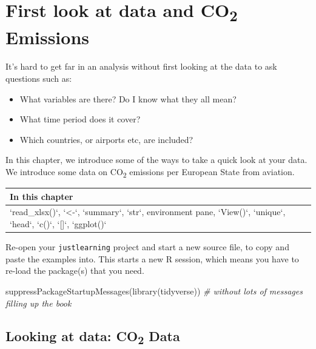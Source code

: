 \documentclass[
]{book}
\newenvironment{Shaded}{\begin{snugshade}}{\end{snugshade}}
\newcommand{\CommentTok}[1]{\textcolor[rgb]{0.56,0.35,0.01}{\textit{#1}}}
\newcommand{\FunctionTok}[1]{\textcolor[rgb]{0.00,0.00,0.00}{#1}}
\newcommand{\NormalTok}[1]{#1}
\providecommand{\tightlist}{%
  \setlength{\itemsep}{0pt}\setlength{\parskip}{0pt}}
\begin{document}
\hypertarget{first-look-at-data-and-co2-emissions}{%
\chapter{\texorpdfstring{First look at data and CO\textsubscript{2} Emissions}{First look at data and CO2 Emissions}}\label{first-look-at-data-and-co2-emissions}}

It's hard to get far in an analysis without first looking at the data to ask questions such as:

\begin{itemize}
\tightlist
\item
  What variables are there? Do I know what they all mean?
\item
  What time period does it cover?
\item
  Which countries, or airports etc, are included?
\end{itemize}

In this chapter, we introduce some of the ways to take a quick look at your data. We introduce some data on CO\textsubscript{2} emissions per European State from aviation.

\begin{tabular}{l}
\hline
In this chapter\\
\hline
`read\_xlsx()`, `<-`, `summary`, `str`, environment pane, `View()`, `unique`, `head`, `c()`, `[]`, `ggplot()`\\
\hline
\end{tabular}

Re-open your \texttt{justlearning} project and start a new source file, to copy and paste the examples into. This starts a new R session, which means you have to re-load the package(s) that you need.

\begin{Shaded}
\begin{Highlighting}[]
\FunctionTok{suppressPackageStartupMessages}\NormalTok{(}\FunctionTok{library}\NormalTok{(tidyverse)) }\CommentTok{\# without lots of messages filling up the book}
\end{Highlighting}
\end{Shaded}

\hypertarget{loadco2}{%
\section{\texorpdfstring{Looking at data: CO\textsubscript{2} Data}{Looking at data: CO2 Data}}\label{loadco2}}
\end{document}

